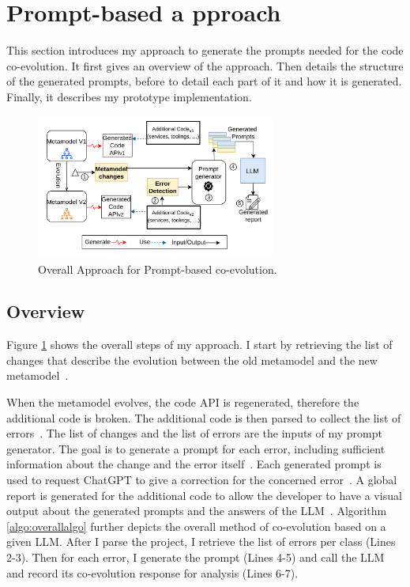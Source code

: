 \section{Prompt-based a
	pproach}
\label{ch3_appraoch}
This section introduces my approach to generate the prompts needed for the code co-evolution. 
It first gives an overview of the approach. Then details the structure of the generated prompts, before to detail each part of it and how it is generated. Finally, it describes my prototype implementation.  

\begin{figure}
	\centering
	\hspace*{-0.8cm}
	\includegraphics[width=0.7\textwidth]{./pics/chapter3pics/approach.png}
	\caption{Overall Approach for Prompt-based co-evolution.}
	\label{fig: approach}
\end{figure}



\subsection{Overview}

Figure \ref{fig: approach} shows the overall steps of my approach. I start by retrieving the list of changes that describe the evolution between the old metamodel and the new metamodel~. 

When the metamodel evolves, the code API is regenerated, therefore the additional code is broken. The additional code is then parsed to collect the list of errors~. The list of changes and the list of errors are the inputs of my prompt generator. The goal is to generate a prompt for each error, including sufficient information about the change and the error itself~.
Each generated prompt is used to request ChatGPT to give a correction for the concerned error~. A global report is generated for the additional code to allow the developer to have a visual output about the generated prompts and the answers of the LLM~. Algorithm \ref{algo:overallalgo} further depicts the overall method of co-evolution based on a given LLM. After I parse the project, I retrieve the list of errors per class (Lines 2-3). Then for each error, I generate the prompt (Lines 4-5) and call the LLM and record its co-evolution response for analysis (Lines 6-7).



